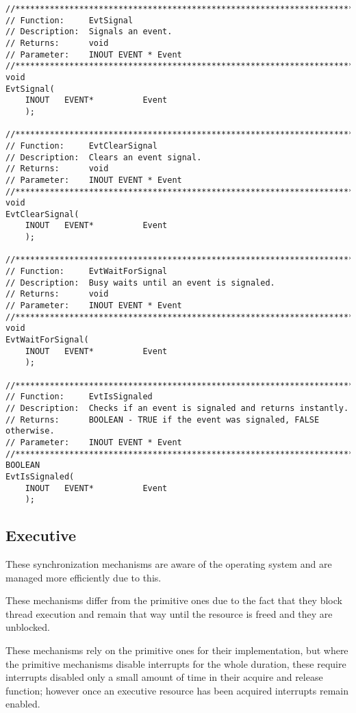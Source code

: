 \begin{appendices}
\begin{lstlisting}[caption={Event Interface},label={lst:Event}]
//******************************************************************************
// Function:     EvtSignal
// Description:  Signals an event.
// Returns:      void
// Parameter:    INOUT EVENT * Event
//******************************************************************************
void
EvtSignal(
    INOUT   EVENT*          Event
    );

//******************************************************************************
// Function:     EvtClearSignal
// Description:  Clears an event signal.
// Returns:      void
// Parameter:    INOUT EVENT * Event
//******************************************************************************
void
EvtClearSignal(
    INOUT   EVENT*          Event
    );

//******************************************************************************
// Function:     EvtWaitForSignal
// Description:  Busy waits until an event is signaled.
// Returns:      void
// Parameter:    INOUT EVENT * Event
//******************************************************************************
void
EvtWaitForSignal(
    INOUT   EVENT*          Event
    );

//******************************************************************************
// Function:     EvtIsSignaled
// Description:  Checks if an event is signaled and returns instantly.
// Returns:      BOOLEAN - TRUE if the event was signaled, FALSE otherwise.
// Parameter:    INOUT EVENT * Event
//******************************************************************************
BOOLEAN
EvtIsSignaled(
    INOUT   EVENT*          Event
    );
\end{lstlisting}

\subsection{Executive}
\label{sect:ExSynch}

These synchronization mechanisms are aware of the operating system and are managed more
efficiently due to this.

These mechanisms differ from the primitive ones due to the fact that they block thread execution and
remain that way until the resource is freed and they are unblocked.

These mechanisms rely on the primitive ones for their implementation, but where the primitive
mechanisms disable interrupts for the whole duration, these require interrupts disabled only a
small amount of time in their acquire and release function; however once an executive resource has
been acquired interrupts remain enabled.


\end{appendices}
